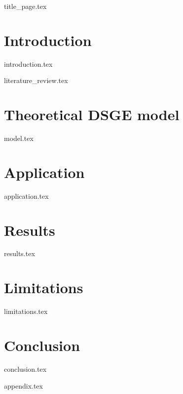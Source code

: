 \documentclass[12pt]{article}
\begin{document}
\setlength{\abovecaptionskip}{0pt}
\begin{sloppypar}
{title_page.tex}
\pagebreak
\tableofcontents
\pagebreak
{}

\section{Introduction}
{introduction.tex}
\newpage

{literature_review.tex}
\newpage

\section{Theoretical DSGE model}
{model.tex}
\newpage

\section{Application} \label{application}
{application.tex}
\newpage

\section{Results}
{results.tex}
\newpage

\section{Limitations}
{limitations.tex}
\newpage

\section{Conclusion}
{conclusion.tex}
\newpage
\printbibliography
\newpage

{appendix.tex}
\end{sloppypar}
\end{document}
